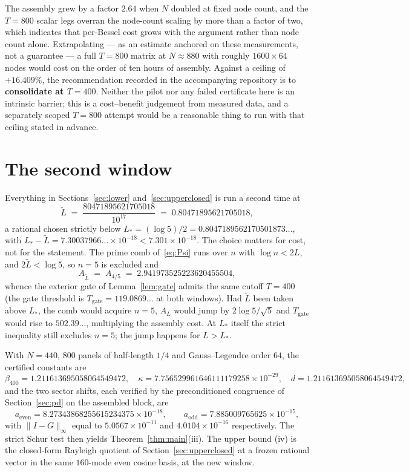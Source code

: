 \documentclass[11pt,a4paper]{article}
\theoremstyle{definition}
\theoremstyle{remark}
\begin{document}
The assembly grew by a factor $2.64$ when $N$ doubled at fixed node count, and
the $T = 800$ scalar legs overran the node-count scaling by more than a factor
of two, which indicates that per-Bessel cost grows with the argument rather than
node count alone. Extrapolating --- as an estimate anchored on these
measurements, not a guarantee --- a full $T = 800$ matrix at $N \approx 880$ with
roughly $1600\times64$ nodes would cost on the order of ten hours of assembly.
Against a ceiling of $+16.409\%$, the recommendation recorded in the
accompanying repository is to \textbf{consolidate at $T = 400$}. Neither the
pilot nor any failed certificate here is an intrinsic barrier; this is a
cost--benefit judgement from measured data, and a separately scoped $T = 800$
attempt would be a reasonable thing to run with that ceiling stated in advance.


\section{The second window}
\label{sec:second}

Everything in Sections~\ref{sec:lower} and~\ref{sec:upperclosed} is run a second
time at
\[
   \widetilde L \;=\; \frac{80471895621705018}{10^{17}}
   \;=\; 0.80471895621705018 ,
\]
a rational chosen strictly below $L_\ast = (\log 5)/2 = 0.8047189562170501873\ldots$,
with $L_\ast - \widetilde L = 7.30037966\ldots\times10^{-18} < 7.301\times10^{-18}$.
The choice matters for cost,
not for the statement. The prime comb of~\eqref{eq:Psi} runs over $n$ with
$\log n < 2L$, and $2\widetilde L < \log 5$, so $n = 5$ is excluded and
\[
   A_{\widetilde L} \;=\; A_{4/5} \;=\; 2.941973525223620455504 ,
\]
whence the exterior gate of Lemma~\ref{lem:gate} admits the same cutoff
$T = 400$ (the gate threshold is $T_{\mathrm{gate}} = 119.0869\ldots$ at both
windows). Had $\widetilde L$ been taken above $L_\ast$, the comb would acquire
$n = 5$, $A_L$ would jump by $2\log 5/\sqrt 5$ and $T_{\mathrm{gate}}$ would rise
to $502.39\ldots$, multiplying the assembly cost. At $L_\ast$ itself the strict
inequality still excludes $n = 5$; the jump happens for $L > L_\ast$.

With $N = 440$, $800$ panels of half-length $1/4$ and Gauss--Legendre order
$64$, the certified constants are
\[
   \beta_{400} = 1.211613695058064549472, \quad
   \kappa = 7.756529961646111179258\times10^{-29}, \quad
   d = 1.211613695058064549472 ,
\]
and the two sector shifts, each verified by the preconditioned congruence of
Section~\ref{sec:pd} on the assembled block, are
\[
   a_{\mathrm{even}} = 8.27343868255615234375\times10^{-18}, \qquad
   a_{\mathrm{odd}} = 7.885009765625\times10^{-15} ,
\]
with $\|I-G\|_\infty$ equal to $5.0567\times10^{-11}$ and
$4.0104\times10^{-16}$ respectively. The strict Schur test then yields
Theorem~\ref{thm:main}(iii). The upper bound (iv) is the closed-form Rayleigh
quotient of Section~\ref{sec:upperclosed} at a frozen rational vector in the
same $160$-mode even cosine basis, at the new window.
\end{document}
